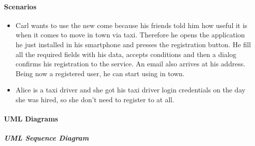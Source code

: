 \paragraph{Scenarios}
\begin{itemize}
	\item Carl wants to use the new come \myTaxiService{} because his friends told him how useful it is when it comes to move in town via taxi.
	Therefore he opens the \myTaxiService{} application he just installed in his smartphone and presses the registration button.
	He fill all the required fields with his data, accepts \myTaxiService{} conditions and then a dialog confirms his registration to the service.
	An email also arrives at his address.
	Being now a registered user, he can start using \myTaxiService{} in town.
	\item Alice is a taxi driver and she got his taxi driver login credentials on the day she was hired, so she don't need to register to \myTaxiService{} at all.
\end{itemize}
\paragraph{UML Diagrams}
\subparagraph{UML Sequence Diagram}
